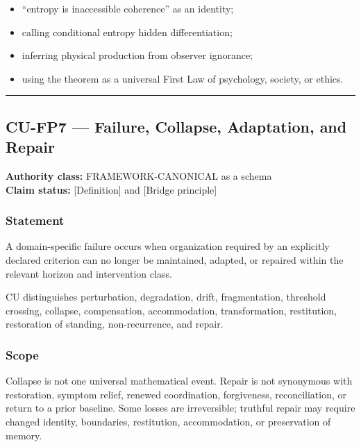 \documentclass[
  11pt,
]{article}
\providecommand{\tightlist}{%
  \setlength{\itemsep}{0pt}\setlength{\parskip}{0pt}}
\begin{document}
\begin{itemize}
\tightlist
\item
  ``entropy is inaccessible coherence'' as an identity;
\item
  calling conditional entropy hidden differentiation;
\item
  inferring physical production from observer ignorance;
\item
  using the theorem as a universal First Law of psychology, society, or
  ethics.
\end{itemize}

\begin{center}\rule{0.5\linewidth}{0.5pt}\end{center}

\subsection{CU-FP7 --- Failure, Collapse, Adaptation, and
Repair}\label{cu-fp7-failure-collapse-adaptation-and-repair}

\textbf{Authority class:} FRAMEWORK-CANONICAL as a schema\\
\textbf{Claim status:} {[}Definition{]} and {[}Bridge principle{]}

\subsubsection{Statement}\label{statement-6}

A domain-specific failure occurs when organization required by an
explicitly declared criterion can no longer be maintained, adapted, or
repaired within the relevant horizon and intervention class.

CU distinguishes perturbation, degradation, drift, fragmentation,
threshold crossing, collapse, compensation, accommodation,
transformation, restitution, restoration of standing, non-recurrence,
and repair.

\subsubsection{Scope}\label{scope-6}

Collapse is not one universal mathematical event. Repair is not
synonymous with restoration, symptom relief, renewed coordination,
forgiveness, reconciliation, or return to a prior baseline. Some losses
are irreversible; truthful repair may require changed identity,
boundaries, restitution, accommodation, or preservation of memory.
\end{document}
